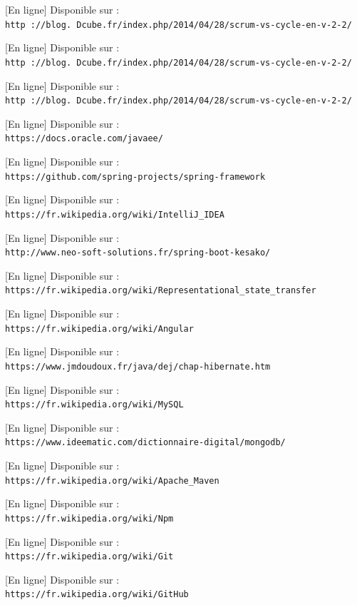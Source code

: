 \documentclass[12pt,a4paper,twoside]{report}
\begin{document}
\renewcommand{\bibname}{Bibliographie et Webographie}
\begin{thebibliography}{3}
	

	[En ligne] Disponible sur :
	\\\texttt{http ://blog. Dcube.fr/index.php/2014/04/28/scrum-vs-cycle-en-v-2-2/}

	[En ligne] Disponible sur :
	\\\texttt{http ://blog. Dcube.fr/index.php/2014/04/28/scrum-vs-cycle-en-v-2-2/}

	[En ligne] Disponible sur :
	\\\texttt{http ://blog. Dcube.fr/index.php/2014/04/28/scrum-vs-cycle-en-v-2-2/}

	[En ligne] Disponible sur :
	\\\texttt{https://docs.oracle.com/javaee/}

	[En ligne] Disponible sur :
	\\\texttt{https://github.com/spring-projects/spring-framework}

	[En ligne] Disponible sur :
	\\\texttt{https://fr.wikipedia.org/wiki/IntelliJ\_IDEA}

	[En ligne] Disponible sur :
	\\\texttt{http://www.neo-soft-solutions.fr/spring-boot-kesako/}

	[En ligne] Disponible sur :
	\\\texttt{https://fr.wikipedia.org/wiki/Representational\_state\_transfer}

	[En ligne] Disponible sur :
	\\\texttt{https://fr.wikipedia.org/wiki/Angular}

	[En ligne] Disponible sur :
	\\\texttt{https://www.jmdoudoux.fr/java/dej/chap-hibernate.htm}

	[En ligne] Disponible sur :
	\\\texttt{https://fr.wikipedia.org/wiki/MySQL}

	[En ligne] Disponible sur :
	\\\texttt{https://www.ideematic.com/dictionnaire-digital/mongodb/}

	[En ligne] Disponible sur :
	\\\texttt{https://fr.wikipedia.org/wiki/Apache\_Maven}

	[En ligne] Disponible sur :
	\\\texttt{https://fr.wikipedia.org/wiki/Npm}

	[En ligne] Disponible sur :
	\\\texttt{https://fr.wikipedia.org/wiki/Git}

	[En ligne] Disponible sur :
	\\\texttt{https://fr.wikipedia.org/wiki/GitHub}
\end{thebibliography}
\end{document}
